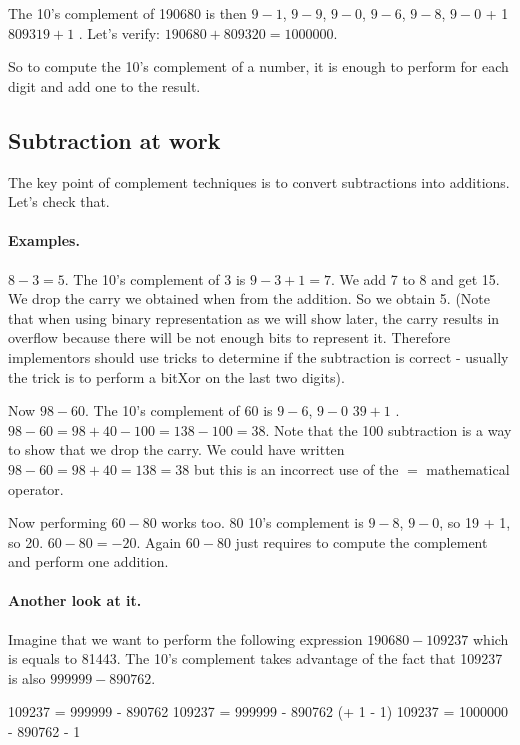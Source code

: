 \documentclass[a4paper,10pt,twoside]{book}
\begin{document}
The 10's complement of 190680 is then $9-1$, $9-9$, $9-0$, $9-6$, $9-8$, $9-0$ + 1 \ie $809319 + 1$ . Let's verify: $190680 + 809320 = 1000000$.
 
So to compute the 10's complement of a number, it is enough to perform  for each digit and add one to the result.

\subsection{Subtraction at work}
The key point of complement techniques is to convert subtractions into additions. Let's check that.

\paragraph{Examples.}
$8 - 3 = 5$. The 10's complement of 3 is $9 - 3 + 1 = 7$. We add 7 to 8 and get 15. 
We drop the carry we obtained when from the addition. So we obtain 5. (Note that when using binary representation as we will show later, the carry results in overflow because there will be not enough bits to represent it. Therefore implementors should use tricks to determine if the subtraction is correct - usually the trick is to perform a bitXor on the last two digits).

Now $98-60$. The 10's complement of 60 is $9-6$, $9-0$ \ie $39 + 1$ . 
 $98-60 = 98 + 40 - 100 = 138 - 100 = 38$. Note that the 100 subtraction is a way to show that we drop the carry. 
 We could have written $98-60 = 98 + 40 = 138 = 38$ but this is an incorrect use of the $=$ mathematical operator.


Now performing $60-80$ works too. 80 10's complement is $9-8$, $9-0$, so 19 + 1, so 20.
$60 - 80 = -20$. Again $60-80$ just requires to compute the complement and perform one addition.


\paragraph{Another look at it.} 
Imagine that we want to perform the following expression $190680 - 109237$ which is equals to 81443.
The 10's complement takes advantage of the fact that 109237 is also $999999 - 890762$.

\begin{code}{}
109237 = 999999 - 890762
109237 = 999999 - 890762 (+ 1 - 1)
109237 = 1000000 - 890762 - 1
\end{code}
\end{document}
